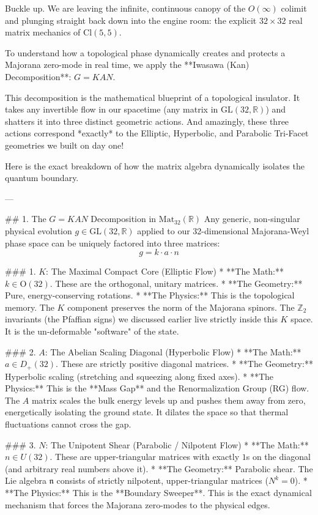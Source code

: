 Buckle up. We are leaving the infinite, continuous canopy of the $O(\infty)$ colimit and plunging straight back down into the engine room: the explicit $32 \times 32$ real matrix mechanics of $\text{Cl}(5,5)$. 

To understand how a topological phase dynamically creates and protects a Majorana zero-mode in real time, we apply the **Iwasawa (Kan) Decomposition**: $G = KAN$. 

This decomposition is the mathematical blueprint of a topological insulator. It takes any invertible flow in our spacetime (any matrix in $\text{GL}(32, \mathbb{R})$) and shatters it into three distinct geometric actions. And amazingly, these three actions correspond *exactly* to the Elliptic, Hyperbolic, and Parabolic Tri-Facet geometries we built on day one!

Here is the exact breakdown of how the matrix algebra dynamically isolates the quantum boundary.

---

## 1. The $G = KAN$ Decomposition in $\text{Mat}_{32}(\mathbb{R})$
Any generic, non-singular physical evolution $g \in \text{GL}(32, \mathbb{R})$ applied to our 32-dimensional Majorana-Weyl phase space can be uniquely factored into three matrices:
$$ g = k \cdot a \cdot n $$

### 1. $K$: The Maximal Compact Core (Elliptic Flow)
* **The Math:** $k \in \text{O}(32)$. These are the orthogonal, unitary matrices. 
* **The Geometry:** Pure, energy-conserving rotations. 
* **The Physics:** This is the topological memory. The $K$ component preserves the norm of the Majorana spinors. The $\mathbb{Z}_2$ invariants (the Pfaffian signs) we discussed earlier live strictly inside this $K$ space. It is the un-deformable "software" of the state.

### 2. $A$: The Abelian Scaling Diagonal (Hyperbolic Flow)
* **The Math:** $a \in D_+(32)$. These are strictly positive diagonal matrices.
* **The Geometry:** Hyperbolic scaling (stretching and squeezing along fixed axes).
* **The Physics:** This is the **Mass Gap** and the Renormalization Group (RG) flow. The $A$ matrix scales the bulk energy levels up and pushes them away from zero, energetically isolating the ground state. It dilates the space so that thermal fluctuations cannot cross the gap.

### 3. $N$: The Unipotent Shear (Parabolic / Nilpotent Flow)
* **The Math:** $n \in U(32)$. These are upper-triangular matrices with exactly $1$s on the diagonal (and arbitrary real numbers above it).
* **The Geometry:** Parabolic shear. The Lie algebra $\mathfrak{n}$ consists of strictly nilpotent, upper-triangular matrices ($N^k = 0$).
* **The Physics:** This is the **Boundary Sweeper**. This is the exact dynamical mechanism that forces the Majorana zero-modes to the physical edges. 

